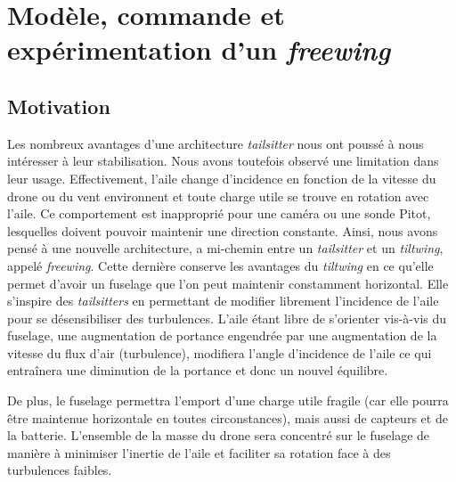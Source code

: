 
\chapter{Modèle, commande et expérimentation d'un \textit{freewing}}
\minitoc
\label{chap:colibri}

\section{Motivation}
\label{sec:motivationcolibri}
Les nombreux avantages d'une architecture \textit{tailsitter} nous ont poussé à nous intéresser à leur stabilisation. Nous avons toutefois observé une limitation dans leur usage. Effectivement, l'aile change d'incidence en fonction de la vitesse du drone ou du vent environnent et toute charge utile se trouve en rotation avec l'aile. Ce comportement est inapproprié pour une caméra ou une sonde Pitot, lesquelles doivent pouvoir maintenir une direction constante. Ainsi, nous avons pensé à une nouvelle architecture, a mi-chemin entre un \textit{tailsitter} et un \textit{tiltwing}, appelé \textit{freewing}. Cette dernière conserve les avantages du \textit{tiltwing} en ce qu'elle permet d'avoir un fuselage que l'on peut maintenir constamment horizontal. Elle s'inspire des \textit{tailsitters} en permettant de modifier librement l'incidence de l'aile pour se désensibiliser des turbulences. L'aile étant libre de s'orienter vis-à-vis du fuselage, une augmentation de portance engendrée par une augmentation de la vitesse du flux d'air (turbulence), modifiera l'angle d'incidence de l'aile ce qui entraînera une diminution de la portance et donc un nouvel équilibre.

De plus, le fuselage permettra l'emport d'une charge utile fragile (car elle pourra être maintenue horizontale en toutes circonstances), mais aussi de capteurs et de la batterie. L'ensemble de la masse du drone sera concentré sur le fuselage de manière à minimiser l'inertie de l'aile et faciliter sa rotation face à des turbulences faibles.

